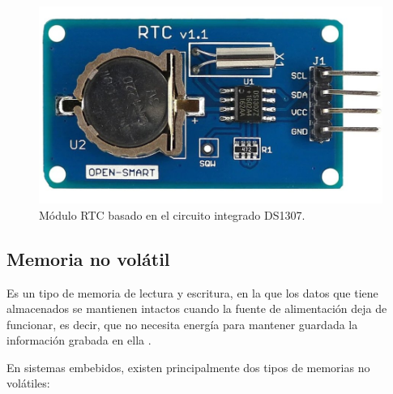 \begin{figure}[h]
	\centering
	\includegraphics[scale=0.2]{./Figures/rtc.jpg}
	\caption{Módulo RTC basado en el circuito integrado DS1307.}
	\label{fig:cuadradoAzul}
\end{figure}

\subsection{Memoria no volátil}

Es un tipo de memoria de lectura y escritura, en la que los datos que tiene almacenados se mantienen intactos cuando la fuente de alimentación deja de funcionar, es decir, que no necesita energía para mantener guardada la información grabada en ella \citep{BOOK:3}.

En sistemas embebidos, existen principalmente dos tipos de memorias no volátiles:


